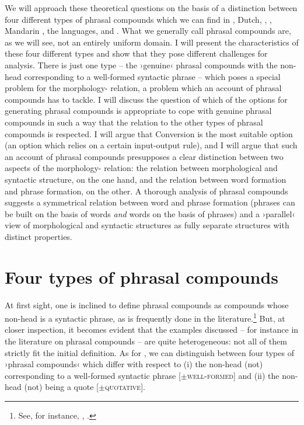 \documentclass[output=paper]{LSP/langsci}
\begin{document}
We will approach these theoretical questions on the basis of a distinction between four different types of phrasal compounds which we can find in , Dutch, , , Mandarin , the  languages, and . What we generally call phrasal compounds are, as we will see, not an entirely uniform domain. I will present the characteristics of these four different types and show that they pose different challenges for analysis. There is just one type – the ›genuine‹ phrasal compounds with the non-head corresponding to a  well-formed syntactic phrase – which poses a special problem for the morphology- relation, a problem which an account of phrasal compounds has to tackle. I will discuss the question of which of the options for generating phrasal compounds is appropriate to cope with genuine phrasal compounds in such a way that the relation to the other types of phrasal compounds is respected. I will argue that Conversion is the most suitable option (an option which relies on a certain input-output rule), and I will argue that such an account of phrasal compounds presupposes a clear distinction between two aspects of the morphology- relation: the relation between morphological and syntactic structure, on the one hand, and the relation between word formation and phrase formation, on the other. A thorough analysis of phrasal compounds suggests a symmetrical relation between word and phrase formation (phrases can be built on the basis of words \textit{and} words on the basis of phrases) and a ›parallel‹ view of morphological and syntactic structures as fully separate structures with distinct properties.
\section{Four types of phrasal compounds}

At first sight, one is inclined to define phrasal compounds as compounds whose non-head is a syntactic phrase, as is frequently done in the literature.\footnote{See, for instance, \citet [155] {Meibauer2003}, \citet [7] {Lawrenz2006}.} But, at closer inspection, it becomes evident that the examples discussed – for instance in the literature on  phrasal compounds – are quite heterogeneous: not all of them strictly fit the initial definition. As for , we can distinguish between four types of ›phrasal compounds‹ which differ with respect to (i) the non-head (not) corresponding to a well-formed syntactic phrase [${\pm}$\textsc{well-formed}] and (ii) the non-head (not) being a quote [${\pm}$\textsc{quotative}].
\end{document}
